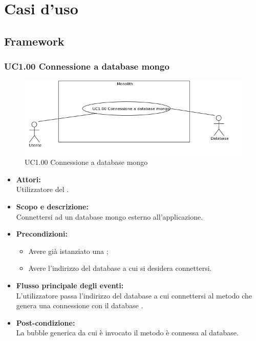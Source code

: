\section{Casi d'uso}

\subsection{Framework}

\subsubsection{UC1.00 Connessione a database mongo} \label{UC1.00}

\begin{figure}[H]
	\centering
	\includegraphics[width=15cm]{../../documenti/AnalisiDeiRequisiti/Diagrammi_img/uc1_00.png}
	\caption{UC1.00 Connessione a database mongo}
\end{figure}

\begin{itemize}
\item \textbf{Attori:}
\\Utilizzatore del .
\item \textbf{Scopo e descrizione:} 
\\Connettersi ad un database mongo esterno all'applicazione.
\item \textbf{Precondizioni:}
	\begin{itemize}
		\item Avere già istanziato una ;
		\item Avere l’indirizzo del database  a cui si desidera connettersi.
	\end{itemize}
\item \textbf{Flusso principale degli eventi:}
\\L’utilizzatore passa l’indirizzo del database a cui connettersi al metodo che genera una connessione con il database .
\item \textbf{Post-condizione:}
\\La bubble generica da cui è invocato il metodo è connessa al database.
\end{itemize}

